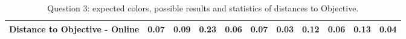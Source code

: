 \begin{table}[H]
{\begin{tabular}{lccccccccccccc}
    \multicolumn{4}{l}{Distance to Objective - Online}                                                                                               & \multicolumn{1}{|c}{\textbf{0.07}}        & \multicolumn{1}{c|}{0.09}    & \multicolumn{1}{|c}{0.23}        & \multicolumn{1}{c|}{0.06}    & \multicolumn{1}{|c}{\textbf{0.07}}       & \multicolumn{1}{c|}{0.03}    & \multicolumn{1}{|c}{0.12}        & \multicolumn{1}{c|}{0.06}    & \multicolumn{1}{|c}{0.13}       & \multicolumn{1}{c|}{0.04}    \\ \hline
    \end{tabular}}
  \caption[Question 3, with expected Results.]{Question 3: expected colors, possible results and statistics of distances to Objective.}
  \vspace{-5pt}
  \label{table:lab_q3_expected}
\end{table}
%
